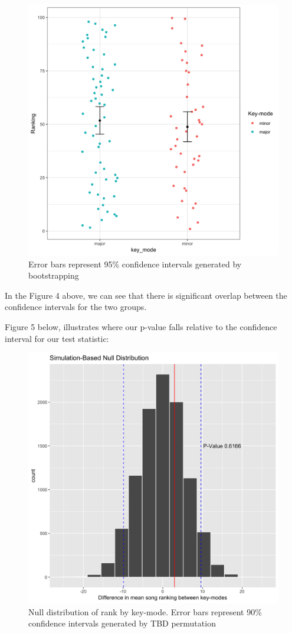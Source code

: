 \documentclass[]{article}
\begin{document}
\begin{figure}[H]
\includegraphics[width=0.8\linewidth]{../results/figure/Fig04_Sample_Compare_Plot} \caption{Error bars represent 95\% confidence intervals generated by bootstrapping}\label{fig:unnamed-chunk-4}
\end{figure}

In the Figure 4 above, we can see that there is significant overlap
between the confidence intervals for the two groups.

Figure 5 below, illustrates where our p-value falls relative to the
confidence interval for our test statistic:

\begin{figure}[H]
\includegraphics[width=0.8\linewidth]{../results/figure/Fig03_Test_Ddistr_Plot} \caption{Null distribution of rank by key-mode.  Error bars represent 90\% confidence intervals generated by TBD permutation}\label{fig:unnamed-chunk-5}
\end{figure}
\end{document}
